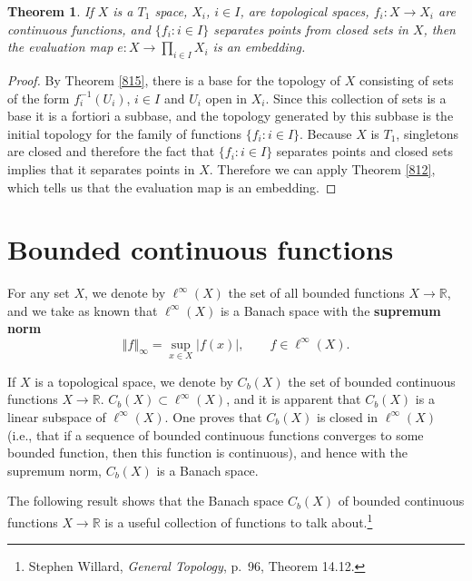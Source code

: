 \documentclass{article}
\newcommand{\norm}[1]{\left\Vert #1 \right\Vert}
\newtheorem{theorem}{Theorem}
\theoremstyle{definition}
\begin{document}
\begin{theorem}
If  $X$ is a $T_1$ space,  $X_i$, $i \in I$, are topological spaces,   $f_i:X \to X_i$ are continuous functions, and $\{f_i: i \in I\}$  separates
points from closed sets in $X$, then the evaluation map $e:X \to \prod_{i \in I} X_i$ is an embedding.
\label{816}
\end{theorem}
\begin{proof}
By Theorem \ref{815}, there is a base for the topology of $X$ consisting of sets of the form $f_i^{-1}(U_i)$, $i \in I$ and $U_i$ open in $X_i$. 
Since this collection of sets is a base it is a fortiori a subbase, and the topology generated by this subbase is the initial topology
for the family of functions $\{f_i: i \in I\}$. Because $X$ is $T_1$, singletons are closed and therefore the fact that $\{f_i: i \in I\}$ separates points and closed
sets implies that it separates points in $X$. Therefore we can apply Theorem \ref{812}, which tells us that the evaluation map is an embedding.
\end{proof}




\section{Bounded continuous functions}
For any set $X$, we denote by $\ell^\infty(X)$ the set of all bounded functions $X \to \mathbb{R}$,
and we take as known that $\ell^\infty(X)$ is a Banach space with the 
\textbf{supremum norm}
\[
\norm{f}_\infty = \sup_{x \in X} |f(x)|, \qquad f \in \ell^\infty(X).
\]

 
 If $X$ is a topological space, we denote by $C_b(X)$ the set of bounded continuous functions $X \to \mathbb{R}$.
 $C_b(X) \subset \ell^\infty(X)$, and it is apparent that $C_b(X)$ is a linear subspace of $\ell^\infty(X)$. One proves that 
 $C_b(X)$ is closed in $\ell^\infty(X)$ (i.e., that if a sequence of bounded continuous functions converges to some bounded function,
 then this function is continuous), and hence  with the supremum norm, $C_b(X)$ is a Banach space.





The following result  shows  that the Banach space $C_b(X)$ of bounded continuous functions $X \to \mathbb{R}$ is
 a  useful collection of functions to talk about.\footnote{Stephen Willard, {\em General Topology}, p.~96, Theorem 14.12.} 
\end{document}
